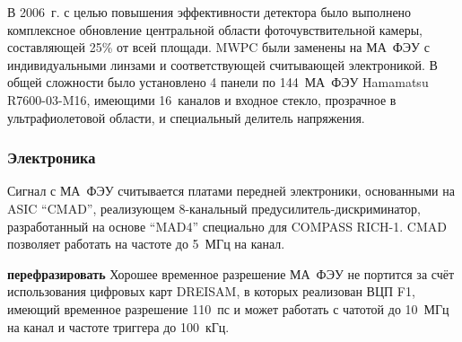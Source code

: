 
В 2006~г. с целью повышения эффективности детектора было выполнено комплексное обновление центральной области фоточувствительной камеры, составляющей 25\% от всей площади. MWPC были заменены на МА~ФЭУ с индивидуальными линзами и соответствующей считывающей электроникой. В общей сложности было установлено 4 панели по 144~МА~ФЭУ Hamamatsu R7600-03-M16, имеющими 16~каналов и входное стекло, прозрачное в ультрафиолетовой области, и специальный делитель напряжения.


\subsubsection{Электроника}

Сигнал с МА~ФЭУ считывается платами передней электроники, основанными на ASIC ``CMAD'', реализующем 8-канальный предусилитель-дискриминатор, разработанный на основе ``MAD4'' специально для COMPASS \mbox{RICH-1}. CMAD позволяет работать на частоте до 5~МГц на канал.


\todo \textbf{перефразировать}
Хорошее временное разрешение МА~ФЭУ не портится за счёт использования цифровых карт DREISAM, в которых реализован ВЦП F1, имеющий временное разрешение 110~пс и может работать с чатотой до 10~МГц на канал и частоте триггера до 100~кГц.


